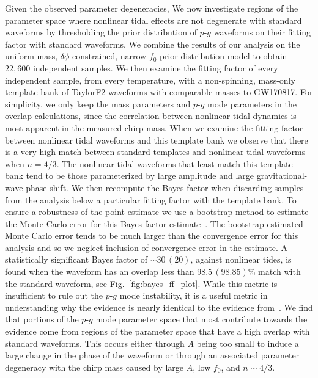 Given the observed parameter degeneracies, We now investigate regions of the parameter space where nonlinear tidal effects are not degenerate with standard waveforms by thresholding the prior distribution of $p$-$g$ waveforms on their fitting factor with standard waveforms. We combine the results of our analysis on the uniform mass, $\delta \phi$ constrained, narrow $f_0$ prior distribution model to obtain $22,600$ independent samples. We then examine the fitting factor of every independent sample, from every temperature, with a non-spinning, mass-only template bank of TaylorF2 waveforms with comparable masses to GW170817. For simplicity, we only keep the mass parameters and $p$-$g$ mode parameters in the overlap calculations, since the correlation between nonlinear tidal dynamics is most apparent in the measured chirp mass. When we examine the fitting factor between nonlinear tidal waveforms and this template bank we observe that there is a very high match between standard templates and nonlinear tidal waveforms when $n = 4/3$. The nonlinear tidal waveforms that least match this template bank tend to be those parameterized by large amplitude and large gravitational-wave phase shift. We then recompute the Bayes factor when discarding samples from the analysis below a particular fitting factor with the template bank. To ensure a robustness of the point-estimate we use a bootstrap method to estimate the Monte Carlo error for this Bayes factor estimate~\citep{efron1992bootstrap}. The bootstrap estimated Monte Carlo error tends to be much larger than the convergence error for this analysis and so we neglect inclusion of convergence error in the estimate. A statistically significant Bayes factor of $\sim 30 \, (20)$, against nonlinear tides, is found when the waveform has an overlap less than $98.5 \, (98.85)$\% match with the standard waveform, see Fig.~\ref{fig:bayes_ff_plot}. While this metric is insufficient to rule out the $p$-$g$ mode instability, it is a useful metric in understanding why the evidence is nearly identical to the evidence from~\cite{de2018tidal}. We find that portions of the $p$-$g$ mode parameter space that most contribute towards the evidence come from regions of the parameter space that have a high overlap with standard waveforms. This occurs either through $A$ being too small to induce a large change in the phase of the waveform or through an associated parameter degeneracy with the chirp mass caused by large $A$, low $f_0$, and $n \sim 4/3$.

